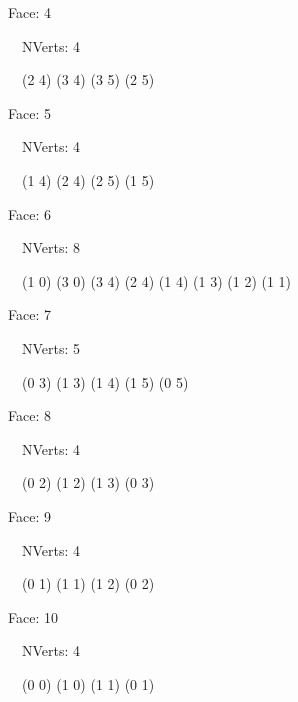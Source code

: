 \documentclass{article}
\begin{document}
    {\footnotesize

    Face: 4

    \   \    NVerts: 4

     \   \   (2 4) (3 4) (3 5) (2 5)}

    {\footnotesize

    Face: 5

    \   \    NVerts: 4

     \   \   (1 4) (2 4) (2 5) (1 5)}

    {\footnotesize

    Face: 6

    \   \    NVerts: 8

     \   \   (1 0) (3 0) (3 4) (2 4) (1 4) (1 3) (1 2) (1 1)}

    {\footnotesize

    Face: 7

    \   \    NVerts: 5

     \   \   (0 3) (1 3) (1 4) (1 5) (0 5)}

    {\footnotesize

    Face: 8

    \   \    NVerts: 4

     \   \   (0 2) (1 2) (1 3) (0 3)}

    {\footnotesize

    Face: 9

    \   \    NVerts: 4

     \   \   (0 1) (1 1) (1 2) (0 2)}

    {\footnotesize

    Face: 10

    \   \    NVerts: 4

     \   \   (0 0) (1 0) (1 1) (0 1)}


     \newpage
\end{document}
